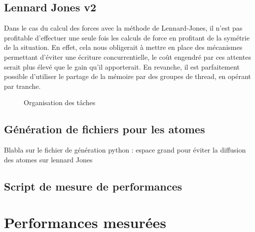 \documentclass{article}
\begin{document}
\subsection{Lennard Jones v2}
Dans le cas du calcul des forces avec la méthode de Lennard-Jones, il n'est pas
profitable d'effectuer une seule fois les calculs de force en profitant de la
symétrie de la situation. En effet, cela nous obligerait à mettre en place des
mécanismes permettant d'éviter une écriture concurrentielle, le coût engendré
par ces attentes serait plus élevé que le gain qu'il apporterait.
En revanche, il est parfaitement possible d'utiliser le partage de la mémoire
par des groupes de thread, en opérant par tranche.
\begin{figure}
  \caption{Organisation des tâches}
  \label{lennard-jones-v2}
\end{figure}


\subsection{Génération de fichiers pour les atomes}
Blabla sur le fichier de génération python : espace grand pour éviter la
diffusion des atomes sur lennard Jones

\subsection{Script de mesure de performances}

\section{Performances mesurées}
\end{document}
